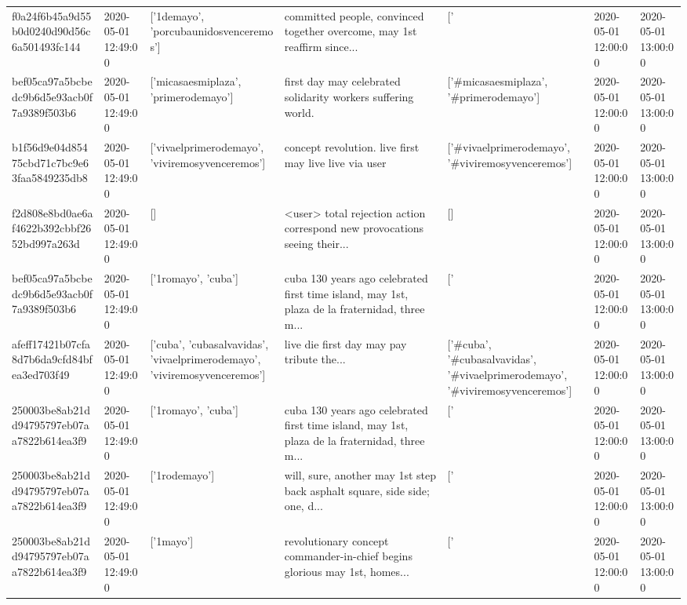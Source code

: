 \begin{tabular}{lllllll}
f0a24f6b45a9d55b0d0240d90d56c6a501493fc144 & 2020-05-01 12:49:00 & ['1demayo', 'porcubaunidosvenceremos'] & committed people, convinced together overcome, may 1st reaffirm since... & ['#1demayo', '#porcubaunidosvenceremos'] & 2020-05-01 12:00:00 & 2020-05-01 13:00:00 \\
bef05ca97a5bcbedc9b6d5e93acb0f7a9389f503b6 & 2020-05-01 12:49:00 & ['micasaesmiplaza', 'primerodemayo'] & first day may celebrated solidarity workers suffering world. & ['#micasaesmiplaza', '#primerodemayo'] & 2020-05-01 12:00:00 & 2020-05-01 13:00:00 \\
b1f56d9e04d85475cbd71c7bc9e63faa5849235db8 & 2020-05-01 12:49:00 & ['vivaelprimerodemayo', 'viviremosyvenceremos'] & concept revolution. live first may live live via user & ['#vivaelprimerodemayo', '#viviremosyvenceremos'] & 2020-05-01 12:00:00 & 2020-05-01 13:00:00 \\
f2d808e8bd0ae6af4622b392cbbf2652bd997a263d & 2020-05-01 12:49:00 & [] & <user> total rejection action correspond new provocations seeing their... & [] & 2020-05-01 12:00:00 & 2020-05-01 13:00:00 \\
bef05ca97a5bcbedc9b6d5e93acb0f7a9389f503b6 & 2020-05-01 12:49:00 & ['1romayo', 'cuba'] & cuba 130 years ago celebrated first time island, may 1st, plaza de la fraternidad, three m... & ['#1romayo', '#cuba'] & 2020-05-01 12:00:00 & 2020-05-01 13:00:00 \\
afeff17421b07cfa8d7b6da9cfd84bfea3ed703f49 & 2020-05-01 12:49:00 & ['cuba', 'cubasalvavidas', 'vivaelprimerodemayo', 'viviremosyvenceremos'] & live die first day may pay tribute the... & ['#cuba', '#cubasalvavidas', '#vivaelprimerodemayo', '#viviremosyvenceremos'] & 2020-05-01 12:00:00 & 2020-05-01 13:00:00 \\
250003be8ab21dd94795797eb07aa7822b614ea3f9 & 2020-05-01 12:49:00 & ['1romayo', 'cuba'] & cuba 130 years ago celebrated first time island, may 1st, plaza de la fraternidad, three m... & ['#1romayo', '#cuba'] & 2020-05-01 12:00:00 & 2020-05-01 13:00:00 \\
250003be8ab21dd94795797eb07aa7822b614ea3f9 & 2020-05-01 12:49:00 & ['1rodemayo'] & will, sure, another may 1st step back asphalt square, side side; one, d... & ['#1rodemayo'] & 2020-05-01 12:00:00 & 2020-05-01 13:00:00 \\
250003be8ab21dd94795797eb07aa7822b614ea3f9 & 2020-05-01 12:49:00 & ['1mayo'] & revolutionary concept commander-in-chief begins glorious may 1st, homes... & ['#1mayo'] & 2020-05-01 12:00:00 & 2020-05-01 13:00:00 \\

\end{tabular}
